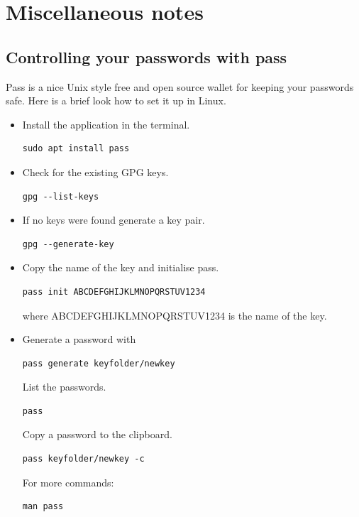 \documentclass{article}
\begin{document}
\section{Miscellaneous notes}

\subsection{Controlling your passwords with pass}
Pass is a nice Unix style free and open source wallet for keeping your passwords safe. Here is a brief look how to set it up in Linux.

\begin{itemize}
\item Install the application in the terminal. \\
\begin{verbatim}
sudo apt install pass  
\end{verbatim}
\item Check for the existing GPG keys. \\
\begin{verbatim}
gpg --list-keys 
\end{verbatim}
\item If no keys were found generate a key pair. \\
\begin{verbatim}
gpg --generate-key
\end{verbatim}
\item Copy the name of the key and initialise pass.\\
\begin{verbatim}
pass init ABCDEFGHIJKLMNOPQRSTUV1234
\end{verbatim}
where ABCDEFGHIJKLMNOPQRSTUV1234 is the name of the key.
\item Generate a password with \\
\begin{verbatim}
pass generate keyfolder/newkey 
\end{verbatim}
List the passwords.
\begin{verbatim}
pass
\end{verbatim}
Copy a password to the clipboard. \\
\begin{verbatim}
pass keyfolder/newkey -c
\end{verbatim}
For more commands:
\begin{verbatim}
man pass
\end{verbatim}
\end{itemize}
\end{document}
